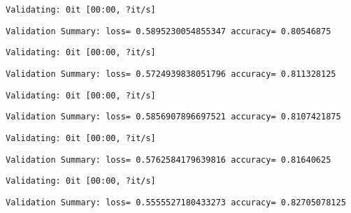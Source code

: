\documentclass[11pt]{article}
\begin{document}
    
    \begin{Verbatim}[commandchars=\\\{\}]
Validating: 0it [00:00, ?it/s]
    \end{Verbatim}

    
    \begin{Verbatim}[commandchars=\\\{\}]
Validation Summary: loss= 0.5895230054855347 accuracy= 0.80546875
    \end{Verbatim}

    
    \begin{Verbatim}[commandchars=\\\{\}]
Validating: 0it [00:00, ?it/s]
    \end{Verbatim}

    
    \begin{Verbatim}[commandchars=\\\{\}]
Validation Summary: loss= 0.5724939838051796 accuracy= 0.811328125
    \end{Verbatim}

    
    \begin{Verbatim}[commandchars=\\\{\}]
Validating: 0it [00:00, ?it/s]
    \end{Verbatim}

    
    \begin{Verbatim}[commandchars=\\\{\}]
Validation Summary: loss= 0.5856907896697521 accuracy= 0.8107421875
    \end{Verbatim}

    
    \begin{Verbatim}[commandchars=\\\{\}]
Validating: 0it [00:00, ?it/s]
    \end{Verbatim}

    
    \begin{Verbatim}[commandchars=\\\{\}]
Validation Summary: loss= 0.5762584179639816 accuracy= 0.81640625
    \end{Verbatim}

    
    \begin{Verbatim}[commandchars=\\\{\}]
Validating: 0it [00:00, ?it/s]
    \end{Verbatim}

    
    \begin{Verbatim}[commandchars=\\\{\}]
Validation Summary: loss= 0.5555527180433273 accuracy= 0.82705078125
    \end{Verbatim}
\end{document}
